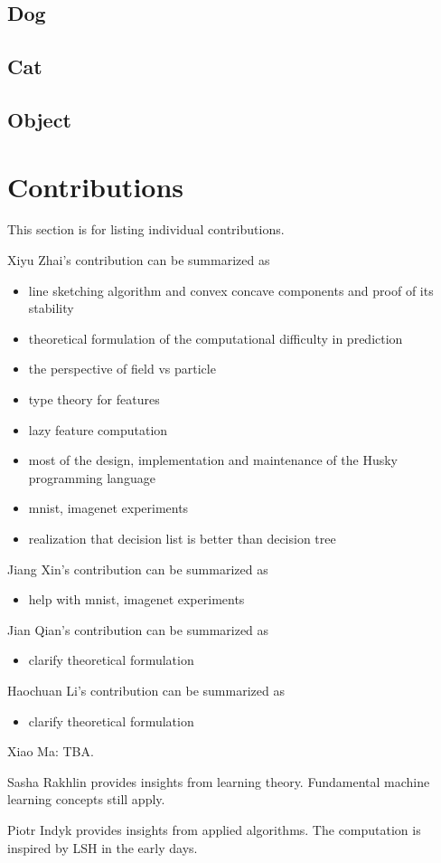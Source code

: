 \documentclass[11pt]{article} 	%
\theoremstyle{definition}
\begin{document}
\subsection{Dog}

\subsection{Cat}

\subsection{Object}

\section{Contributions}

This section is for listing individual contributions.

Xiyu Zhai's contribution can be summarized as
\begin{itemize}
	\item line sketching algorithm and convex concave components and proof of its stability
	\item theoretical formulation of the computational difficulty in prediction
	\item the perspective of field vs particle
	\item type theory for features
	\item lazy feature computation
	\item most of the design, implementation and maintenance of the Husky programming language
	\item mnist, imagenet experiments
	\item realization that decision list is better than decision tree
\end{itemize}

Jiang Xin's contribution can be summarized as
\begin{itemize}
	\item help with mnist, imagenet experiments
\end{itemize}

Jian Qian's contribution can be summarized as
\begin{itemize}
	\item clarify theoretical formulation
\end{itemize}

Haochuan Li's contribution can be summarized as
\begin{itemize}
	\item clarify theoretical formulation
\end{itemize}

Xiao Ma: TBA.

Sasha Rakhlin provides insights from learning theory. Fundamental machine learning concepts still apply.

Piotr Indyk provides insights from applied algorithms. The computation is inspired by LSH in the early days.


\end{document}
